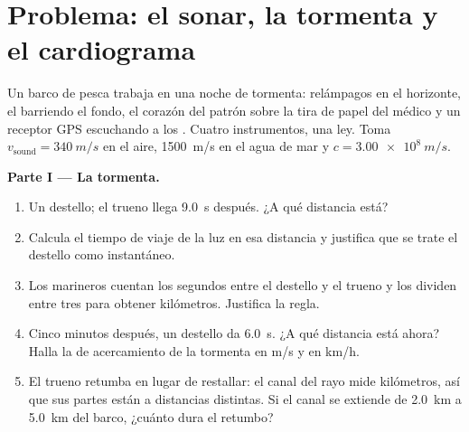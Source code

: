 \section{Problema: el sonar, la tormenta y el cardiograma}

\begin{problem}[{Problema de fin de semana --- leer las señales del
mundo: una sola ley, $d = v\,t$, mide una tormenta, cartografía un fondo
marino, cuenta un latido y deja entrever cómo funciona el GPS}]
\label{pb:g10:signals-and-waves:1}
Un barco de pesca trabaja en una noche de tormenta: relámpagos en el
horizonte, el  barriendo el fondo, el corazón del patrón sobre la
tira de papel del médico y un receptor GPS escuchando a los .
Cuatro instrumentos, una ley. Toma
$v_{\text{sound}} = \qty{340}{m/s}$ en el aire, \qty{1500}{m/s} en el
agua de mar y $c = \qty{3.00e8}{m/s}$.

\medskip
\noindent\textbf{Parte I --- La tormenta.}
\begin{enumerate}
  \item Un destello; el trueno llega \qty{9.0}{s} después. ¿A qué
        distancia está?
  \item Calcula el tiempo de viaje de la luz en esa distancia y
        justifica que se trate el destello como instantáneo.
  \item Los marineros cuentan los segundos entre el destello y el trueno
        y los dividen entre tres para obtener kilómetros. Justifica la
        regla.
  \item Cinco minutos después, un destello da \qty{6.0}{s}. ¿A qué
        distancia está ahora? Halla la  de acercamiento
        de la tormenta en \unit{m/s} y en \unit{km/h}.
  \item El trueno retumba en lugar de restallar: el canal del rayo mide
        kilómetros, así que sus partes están a distancias distintas. Si
        el canal se extiende de \qty{2.0}{km} a \qty{5.0}{km} del barco,
        ¿cuánto dura el retumbo?
\end{enumerate}


\end{problem}
